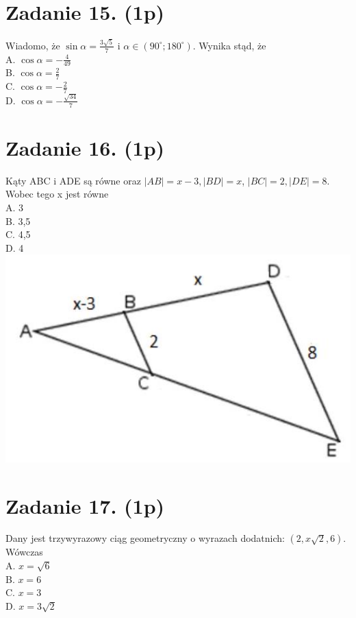 \documentclass[10pt]{article}
\begin{document}
\section*{Zadanie 15. (1p)}
Wiadomo, że \(\sin \alpha=\frac{3 \sqrt{5}}{7}\) i \(\alpha \in\left(90^{\circ} ; 180^{\circ}\right)\). Wynika stąd, że\\
A. \(\cos \alpha=-\frac{4}{49}\)\\
B. \(\cos \alpha=\frac{2}{7}\)\\
C. \(\cos \alpha=-\frac{2}{7}\)\\
D. \(\cos \alpha=-\frac{\sqrt{34}}{7}\)

\section*{Zadanie 16. (1p)}
Kąty ABC i ADE są równe oraz \(|A B|=x-3,|B D|=x\), \(|B C|=2,|D E|=8\). Wobec tego x jest równe\\
A. 3\\
B. 3,5\\
C. 4,5\\
D. 4\\
\includegraphics[max width=\textwidth, center]{2024_11_21_cce9c7ad32a1dbcd58dag-06}

\section*{Zadanie 17. (1p)}
Dany jest trzywyrazowy ciąg geometryczny o wyrazach dodatnich: \((2, x \sqrt{2}, 6)\). Wówczas\\
A. \(x=\sqrt{6}\)\\
B. \(x=6\)\\
C. \(x=3\)\\
D. \(x=3 \sqrt{2}\)
\end{document}
